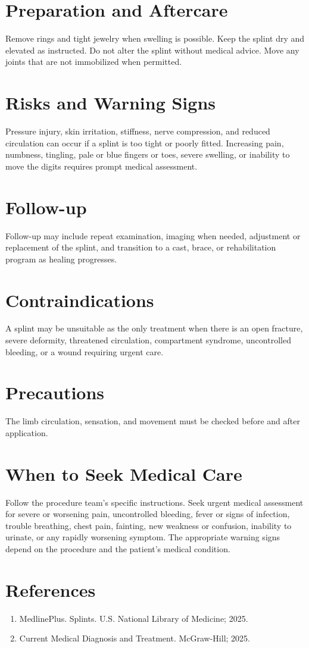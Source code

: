 \section*{Preparation and Aftercare}
Remove rings and tight jewelry when swelling is possible. Keep the splint dry and elevated as instructed. Do not alter the splint without medical advice. Move any joints that are not immobilized when permitted.

\section*{Risks and Warning Signs}
Pressure injury, skin irritation, stiffness, nerve compression, and reduced circulation can occur if a splint is too tight or poorly fitted. Increasing pain, numbness, tingling, pale or blue fingers or toes, severe swelling, or inability to move the digits requires prompt medical assessment.

\section*{Follow-up}
Follow-up may include repeat examination, imaging when needed, adjustment or replacement of the splint, and transition to a cast, brace, or rehabilitation program as healing progresses.

\section*{Contraindications}
A splint may be unsuitable as the only treatment when there is an open fracture, severe deformity, threatened circulation, compartment syndrome, uncontrolled bleeding, or a wound requiring urgent care.

\section*{Precautions}
The limb circulation, sensation, and movement must be checked before and after application.

\section*{When to Seek Medical Care}
Follow the procedure team's specific instructions. Seek urgent medical assessment for severe or worsening pain, uncontrolled bleeding, fever or signs of infection, trouble breathing, chest pain, fainting, new weakness or confusion, inability to urinate, or any rapidly worsening symptom. The appropriate warning signs depend on the procedure and the patient's medical condition.

\section*{References}
\begin{enumerate}
  \item MedlinePlus. Splints. U.S. National Library of Medicine; 2025.
  \item Current Medical Diagnosis and Treatment. McGraw-Hill; 2025.
\end{enumerate}
\clearpage
